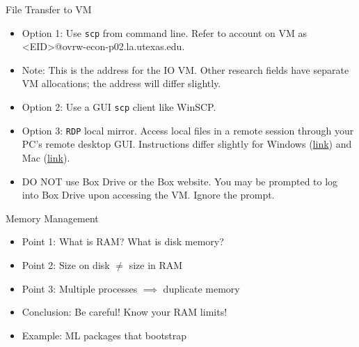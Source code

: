 \documentclass[aspectratio=1610,handout]{beamer}
\begin{document}
\begin{frame}[fragile]{File Transfer to VM}
    \begin{itemize}
        \item Option 1: Use \verb|scp| from command line.  Refer to account on VM as <EID>@ovrw-econ-p02.la.utexas.edu.
        \item Note: This is the address for the IO VM. Other research fields have separate VM allocations; the address will differ slightly.
        \item Option 2: Use a GUI \verb|scp| client like WinSCP.
        \item Option 3: \verb|RDP| local mirror. Access local files in a remote session through your PC's remote desktop GUI.  Instructions differ slightly for Windows (\href{https://www.thesagenext.com/support/access-local-drive-files-from-remote-desktop-session}{link}) and Mac (\href{https://ticket.summithosting.com/hc/en-us/articles/360041678333-RDP-Adding-Local-Drives-Devices-Mac-OS-X}{link}).
        \item DO NOT use Box Drive or the Box website.  You may be prompted to log into Box Drive upon accessing the VM.  Ignore the prompt.
    \end{itemize}
\end{frame}


\begin{frame}{Memory Management}
    \begin{itemize}
        \item Point 1: What is RAM? What is disk memory?
        \pause
        \item Point 2: Size on disk $\ne$ size in RAM
        \pause
        \item Point 3: Multiple processes $\implies$ duplicate memory
        \pause
        \item Conclusion: Be careful! Know your RAM limits!
        \pause
        \item Example: ML packages that bootstrap
    \end{itemize}
\end{frame}
\end{document}
